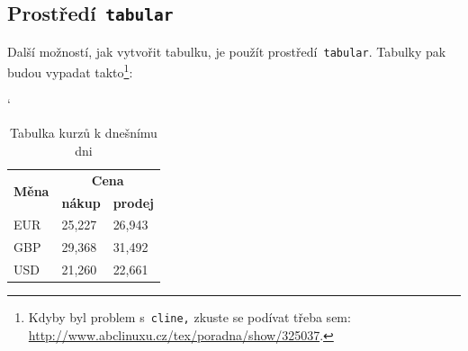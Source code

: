\documentclass[a4paper, 11pt]{article}
\begin{document}
  \subsection{Prostředí\texttt{ tabular}}
  Další možností, jak vytvořit tabulku, je použít prostředí\texttt{ tabular}.
  Tabulky pak budou vypadat
  takto\footnote{Kdyby byl problem s\texttt{ cline,} zkuste se podívat třeba sem:
  \href{http://www.abclinuxu.cz/tex/poradna/show/325037.}{http://www.abclinuxu.cz/tex/poradna/show/325037}.}:
  \bigskip
  \begin{table}[h]
    \centering
    \catcode`
    \begin{tabular}{|l|l|l|}
      \hline
      \multirow[b]{2}{*}{\textbf{Měna}} &
        \multicolumn{2}{c|}{\textbf{Cena}} \\ \cline{2-3}
      & \textbf{nákup} & \textbf{prodej} \\
      \hline
      EUR & 25,227 & 26,943 \\
      \hline
      GBP & 29,368 & 31,492 \\
      \hline
      USD & 21,260 & 22,661 \\
      \hline
    \end{tabular}
    \caption{Tabulka kurzů k dnešnímu dni}
    \label{tab1}
  \end{table}
  \bigskip
\end{document}

